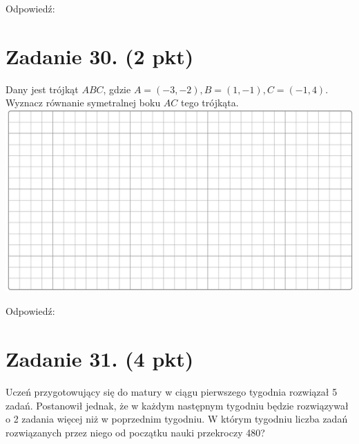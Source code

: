 \documentclass[10pt]{article}
\begin{document}
Odpowiedź:

\section*{Zadanie 30. (2 pkt)}
Dany jest trójkąt \(A B C\), gdzie \(A=(-3,-2), B=(1,-1), C=(-1,4)\). Wyznacz równanie symetralnej boku \(A C\) tego trójkąta.\\
\includegraphics[max width=\textwidth, center]{2024_11_21_769d5953f978b92e06f5g-12}

Odpowiedź:

\section*{Zadanie 31. (4 pkt)}
Uczeń przygotowujący się do matury w ciągu pierwszego tygodnia rozwiązał 5 zadań. Postanowił jednak, że w każdym następnym tygodniu będzie rozwiązywał o 2 zadania więcej niż w poprzednim tygodniu. W którym tygodniu liczba zadań rozwiązanych przez niego od początku nauki przekroczy 480?
\end{document}
